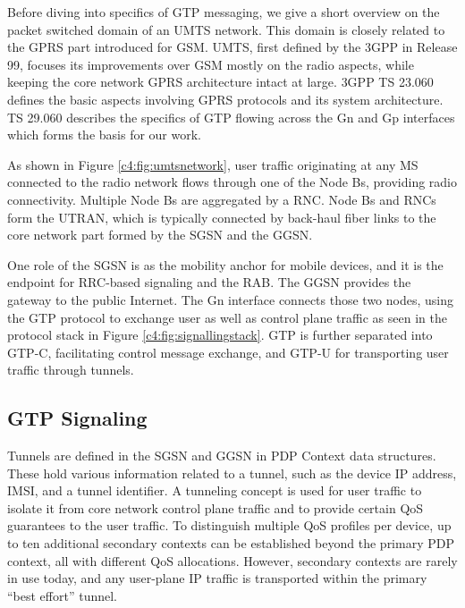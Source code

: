 Before diving into specifics of \ac{GTP} messaging, we give a short overview on the packet switched domain of an \ac{UMTS} network. This domain is closely related to the \ac{GPRS} part introduced for \acs{GSM}. \ac{UMTS}, first defined by the \ac{3GPP} in Release 99, focuses its improvements over \ac{GSM} mostly on the radio aspects, while keeping the core network \ac{GPRS} architecture intact at large. \ac{3GPP} \ac{TS} 23.060 \cite{3gpp23.060} defines the basic aspects involving \ac{GPRS} protocols and its system architecture. \ac{TS} 29.060 \cite{3gpp29.060} describes the specifics of \ac{GTP} flowing across the Gn and Gp interfaces which forms the basis for our work.

As shown in Figure \ref{c4:fig:umtsnetwork}, user traffic originating at any \ac{MS} connected to the radio network flows through one of the Node Bs, providing radio connectivity. Multiple Node Bs are aggregated by a \ac{RNC}. Node Bs and \acp{RNC} form the \ac{UTRAN}, which is typically connected by back-haul fiber links to the core network part formed by the \ac{SGSN} and the \ac{GGSN}.

One role of the \ac{SGSN} is as the mobility anchor for mobile devices, and it is the endpoint for \ac{RRC}-based signaling and the \ac{RAB}. The \ac{GGSN} provides the gateway to the public Internet. The Gn interface connects those two nodes, using the \ac{GTP} protocol to exchange user as well as control plane traffic as seen in the protocol stack in Figure \ref{c4:fig:signallingstack}. \ac{GTP} is further separated into GTP-C, facilitating control message exchange, and GTP-U for transporting user traffic through tunnels.



\subsection{GTP Signaling}


Tunnels are defined in the \ac{SGSN} and \ac{GGSN} in \ac{PDP} Context data structures. These hold various information related to a tunnel, such as the device IP address, \ac{IMSI}, and a tunnel identifier. A tunneling concept is used for user traffic to isolate it from core network control plane traffic and to provide certain \ac{QoS} guarantees to the user traffic. To distinguish multiple \ac{QoS} profiles per device, up to ten additional secondary contexts can be established beyond the primary PDP context, all with different \ac{QoS} allocations. However, secondary contexts are rarely in use today, and any user-plane IP traffic is transported within the primary ``best effort'' tunnel.

